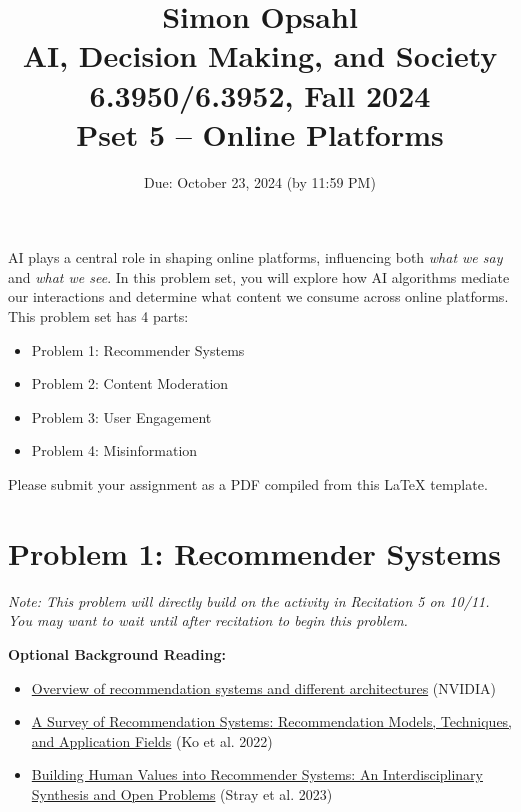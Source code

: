 \documentclass{article}
\title{\textbf{Simon Opsahl}\\AI, Decision Making, and Society\\6.3950/6.3952, Fall 2024\\Pset 5 -- Online Platforms}
\begin{document}
\date{Due: October 23, 2024 (by 11:59 PM)}

\maketitle
\section*{}

AI plays a central role in shaping online platforms, influencing both \textit{what we say} and \textit{what we see}. In this problem set, you will explore how AI algorithms mediate our interactions and determine what content we consume across online platforms. This problem set has 4 parts:
\begin{itemize}
    \item Problem 1: Recommender Systems
    \item Problem 2: Content Moderation
    \item Problem 3: User Engagement
    \item Problem 4: Misinformation
\end{itemize}


Please submit your assignment as a PDF compiled from this LaTeX template.

\newpage

\section*{Problem 1: Recommender Systems}
\textit{Note: This problem will directly build on the activity in Recitation 5 on 10/11. You may want to wait until after recitation to begin this problem.}

\bigskip 
\textbf{Optional Background Reading:}
\begin{itemize}
\item \href{https://www.nvidia.com/en-us/glossary/recommendation-system}{Overview of recommendation systems and different architectures} (NVIDIA)
\item \href{https://www.mdpi.com/2079-9292/11/1/141}{A Survey of Recommendation Systems: Recommendation Models, Techniques, and Application Fields} (Ko et al. 2022)
\item \href{https://dl.acm.org/doi/pdf/10.1145/3632297}{Building Human Values into Recommender Systems: An Interdisciplinary Synthesis and Open Problems} (Stray et al. 2023)
\end{itemize}
\bigskip 
\end{document}
